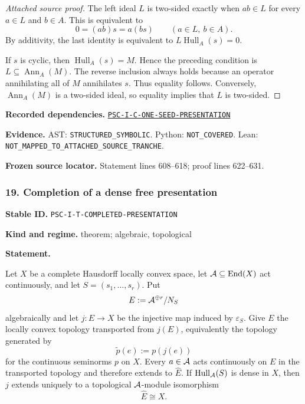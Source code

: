 \documentclass[a4paper,11pt]{article}
\newcommand{\Hull}{\operatorname{Hull}}\newcommand{\srank}{\operatorname{srank}}\newcommand{\psrank}{\operatorname{psrank}}\newcommand{\End}{\operatorname{End}}\newcommand{\Hom}{\operatorname{Hom}}\newcommand{\im}{\operatorname{im}}\newcommand{\Ker}{\operatorname{Ker}}\newcommand{\Jac}{\operatorname{Jac}}\newcommand{\Irr}{\operatorname{Irr}}\newcommand{\Span}{\operatorname{span}}\newcommand{\alg}{\operatorname{alg}}\newcommand{\Reach}{\operatorname{Reach}}\newcommand{\Supp}{\operatorname{Supp}}\newcommand{\id}{\mathrm{id}}\newcommand{\cl}[1]{\overline{#1}}
\newcommand{\field}[2]{\noindent\textbf{#1.} #2\par}
\begin{document}
\begin{proof}[Attached source proof]
The left ideal $L$ is two-sided exactly when $ab\in L$ for every $a\in L$ and $b\in A$.  This is equivalent to
\[
0=(ab)s=a(bs)
\qquad(a\in L,\ b\in A).
\]
By additivity, the last identity is equivalent to $L\Hull_A(s)=0$.

If $s$ is cyclic, then $\Hull_A(s)=M$.  Hence the preceding condition is $L\subseteq\operatorname{Ann}_A(M)$.  The reverse inclusion always holds because an operator annihilating all of $M$ annihilates $s$.  Thus equality follows.  Conversely, $\operatorname{Ann}_A(M)$ is a two-sided ideal, so equality implies that $L$ is two-sided.
\end{proof}
\field{Recorded dependencies}{\hyperref[rec:PSC-I-C-ONE-SEED-PRESENTATION]{\nolinkurl{PSC-I-C-ONE-SEED-PRESENTATION}}}
\field{Evidence}{AST: \nolinkurl{STRUCTURED_SYMBOLIC}. Python: \nolinkurl{NOT_COVERED}. Lean: \nolinkurl{NOT_MAPPED_TO_ATTACHED_SOURCE_TRANCHE}.}
\field{Frozen source locator}{Statement lines 608--618; proof lines 622--631.}
\subsubsection*{19. Completion of a dense free presentation}
\label{rec:PSC-I-T-COMPLETED-PRESENTATION}
\field{Stable ID}{\nolinkurl{PSC-I-T-COMPLETED-PRESENTATION}}
\field{Kind and regime}{theorem; algebraic, topological}
\textbf{Statement.}\par
Let $X$ be a complete Hausdorff locally convex space, let $\A\subseteq\End(X)$ act continuously, and let $S=(s_1,\ldots,s_r)$.  Put
\[
E:=\mathcal A^{\oplus r}/N_S
\]
algebraically and let $j:E\to X$ be the injective map induced by $\varepsilon_S$.  Give $E$ the locally convex topology transported from $j(E)$, equivalently the topology generated by
\[
\widetilde p(e):=p(j(e))
\]
for the continuous seminorms $p$ on $X$.  Every $a\in\mathcal A$ acts continuously on $E$ in the transported topology and therefore extends to $\widehat E$.  If $\Hull_{\A}(S)$ is dense in $X$, then $j$ extends uniquely to a topological $\mathcal A$-module isomorphism
\[
\boxed{\widehat E\cong X.}
\]
\end{document}
